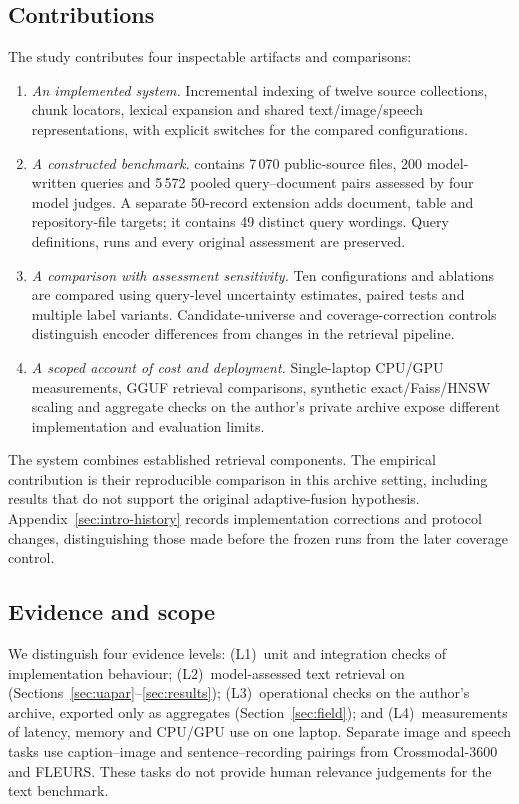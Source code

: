 \subsection{Contributions}
The study contributes four inspectable artifacts and comparisons:
\begin{enumerate}[label=(\alph*)]
\item \emph{An implemented system.} Incremental indexing of twelve source collections, chunk locators, lexical expansion and shared text/image/speech representations, with explicit switches for the compared configurations.
\item \emph{A constructed benchmark.} \uapar{} contains 7\,070 public-source files, 200 model-written queries and 5\,572 pooled query--document pairs assessed by four model judges. A separate 50-record extension adds document, table and repository-file targets; it contains 49 distinct query wordings. Query definitions, runs and every original assessment are preserved.
\item \emph{A comparison with assessment sensitivity.} Ten configurations and ablations are compared using query-level uncertainty estimates, paired tests and multiple label variants. Candidate-universe and coverage-correction controls distinguish encoder differences from changes in the retrieval pipeline.
\item \emph{A scoped account of cost and deployment.} Single-laptop CPU/GPU measurements, GGUF retrieval comparisons, synthetic exact/Faiss/HNSW scaling and aggregate checks on the author's private archive expose different implementation and evaluation limits.
\end{enumerate}
The system combines established retrieval components. The empirical contribution is their reproducible comparison in this archive setting, including results that do not support the original adaptive-fusion hypothesis. Appendix~\ref{sec:intro-history} records implementation corrections and protocol changes, distinguishing those made before the frozen runs from the later coverage control.

\subsection{Evidence and scope}
We distinguish four evidence levels:
(L1)~unit and integration checks of implementation behaviour;
(L2)~model-assessed text retrieval on \uapar{} (Sections~\ref{sec:uapar}--\ref{sec:results});
(L3)~operational checks on the author's archive, exported only as aggregates (Section~\ref{sec:field}); and
(L4)~measurements of latency, memory and CPU/GPU use on one laptop.
Separate image and speech tasks use caption--image and sentence--recording pairings from Crossmodal-3600 and FLEURS. These tasks do not provide human relevance judgements for the text benchmark.

